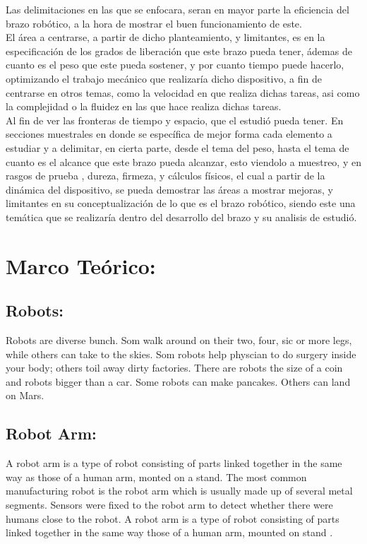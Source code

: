 \documentclass[14pt,a4paper]{article}
\begin{document}
Las delimitaciones en las que se enfocara, seran en mayor parte la eficiencia del brazo robótico, a la hora de mostrar el buen funcionamiento de este.\\
El área a centrarse, a partir de dicho planteamiento, y limitantes, es en la especificación de los grados de liberación que este brazo pueda tener, ádemas de cuanto es el peso que este pueda sostener, y por cuanto tiempo puede hacerlo, optimizando el trabajo mecánico que realizaría dicho dispositivo, a fin de centrarse en otros temas, como la velocidad en que realiza dichas tareas, asi como la complejidad o la fluidez en las que hace realiza dichas tareas.\\
Al fin de ver las fronteras de tiempo y espacio, que el estudió pueda tener. En secciones muestrales en donde se específica de mejor forma cada elemento a estudiar y a delimitar, en cierta parte, desde el tema del peso, hasta el tema de cuanto es el alcance que este brazo pueda alcanzar, esto viendolo a muestreo, y en rasgos de prueba , dureza, firmeza, y cálculos físicos, el cual a partir de la dinámica del dispositivo, se pueda demostrar las áreas a mostrar mejoras, y limitantes en su conceptualización de lo que es el brazo robótico, siendo este una temática que se realizaría dentro del desarrollo del brazo y su analisis de estudió.

\section{Marco Teórico:}

\subsection{Robots:}
Robots are diverse bunch. Som walk around on their two, four, sic or more legs, while others can take to the skies. Som robots help physcian to do surgery inside your body; others toil away dirty factories. There are robots the size of a coin and robots bigger than a car. Some robots can make pancakes. Others can land on Mars.

\subsection{Robot Arm:} 
A robot arm is a type of robot consisting of parts linked together in the same way as those of a human arm, monted on a stand.
The most common manufacturing robot is the robot arm which is usually made up of several metal segments.
Sensors were fixed to the robot arm to detect whether there were humans close to the robot.
A robot arm is a type of robot consisting of parts linked together in the same way those of a human arm, mounted on stand \citep{schilling1990fundamentals} .
\end{document}
